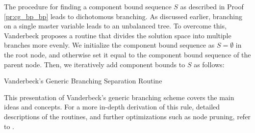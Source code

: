 The procedure for finding a component bound sequence $S$ as described in Proof \ref{pr:cg_bp_bp} leads to dichotomous branching. As discussed earlier, branching on a single master variable leads to an unbalanced tree. To overcome this, Vanderbeck proposes a routine that divides the solution space into multiple branches more evenly. We initialize the component bound sequence as $S = \emptyset$ in the root node, and otherwise set it equal to the component bound sequence of the parent node. Then, we iteratively add component bounds to $S$ as follows:

\begin{algorithm}
\caption{Vanderbeck's Generic Branching Separation Routine}
\end{algorithm}

This presentation of Vanderbeck's generic branching scheme covers the main ideas and concepts. For a more in-depth derivation of this rule, detailed descriptions of the routines, and further optimizations such as node pruning, refer to \cite{vanderbeck1996exact, vanderbeck2010reformulation, vanderbeck2011branching, schmickerath2012experiments}.
